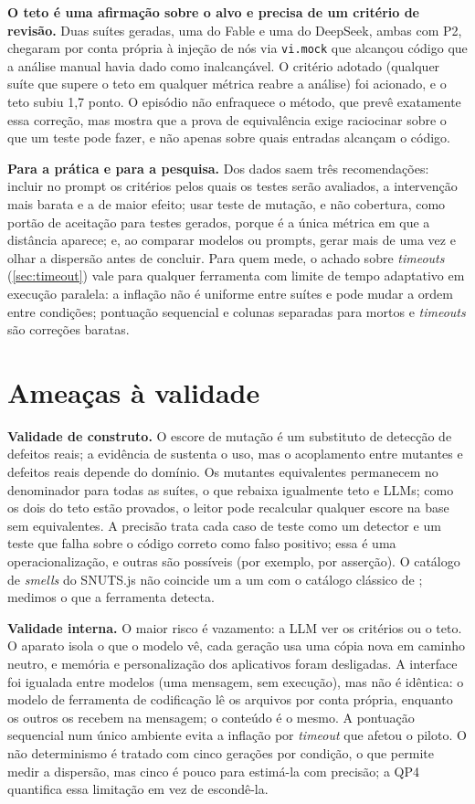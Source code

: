 \textbf{O teto é uma afirmação sobre o alvo e precisa de um critério de revisão.} Duas suítes geradas, uma do Fable e uma do DeepSeek, ambas com P2, chegaram por conta própria à injeção de nós via \texttt{vi.mock} que alcançou código que a análise manual havia dado como inalcançável. O critério adotado (qualquer suíte que supere o teto em qualquer métrica reabre a análise) foi acionado, e o teto subiu 1,7 ponto. O episódio não enfraquece o método, que prevê exatamente essa correção, mas mostra que a prova de equivalência exige raciocinar sobre o que um teste pode fazer, e não apenas sobre quais entradas alcançam o código.

\textbf{Para a prática e para a pesquisa.} Dos dados saem três recomendações: incluir no prompt os critérios pelos quais os testes serão avaliados, a intervenção mais barata e a de maior efeito; usar teste de mutação, e não cobertura, como portão de aceitação para testes gerados, porque é a única métrica em que a distância aparece; e, ao comparar modelos ou prompts, gerar mais de uma vez e olhar a dispersão antes de concluir. Para quem mede, o achado sobre \textit{timeouts} (\autoref{sec:timeout}) vale para qualquer ferramenta com limite de tempo adaptativo em execução paralela: a inflação não é uniforme entre suítes e pode mudar a ordem entre condições; pontuação sequencial e colunas separadas para mortos e \textit{timeouts} são correções baratas.

\section{Ameaças à validade}
\label{sec:ameacas}

\textbf{Validade de construto.} O escore de mutação é um substituto de detecção de defeitos reais; a evidência de  sustenta o uso, mas o acoplamento entre mutantes e defeitos reais depende do domínio. Os mutantes equivalentes permanecem no denominador para todas as suítes, o que rebaixa igualmente teto e LLMs; como os dois do teto estão provados, o leitor pode recalcular qualquer escore na base sem equivalentes. A precisão trata cada caso de teste como um detector e um teste que falha sobre o código correto como falso positivo; essa é uma operacionalização, e outras são possíveis (por exemplo, por asserção). O catálogo de \textit{smells} do SNUTS.js não coincide um a um com o catálogo clássico de ; medimos o que a ferramenta detecta.

\textbf{Validade interna.} O maior risco é vazamento: a LLM ver os critérios ou o teto. O aparato isola o que o modelo vê, cada geração usa uma cópia nova em caminho neutro, e memória e personalização dos aplicativos foram desligadas. A interface foi igualada entre modelos (uma mensagem, sem execução), mas não é idêntica: o modelo de ferramenta de codificação lê os arquivos por conta própria, enquanto os outros os recebem na mensagem; o conteúdo é o mesmo. A pontuação sequencial num único ambiente evita a inflação por \textit{timeout} que afetou o piloto. O não determinismo é tratado com cinco gerações por condição, o que permite medir a dispersão, mas cinco é pouco para estimá-la com precisão; a QP4 quantifica essa limitação em vez de escondê-la.

